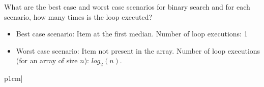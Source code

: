 \begin{exercise}
What are the best case and worst case scenarios for binary search and for each scenario, how many times is the loop executed?
\end{exercise}
\begin{answer}
\begin{itemize}
\item Best case scenario: Item at the first median. Number of loop executions: 1
\item Worst case scenario: Item not present in the array. Number of loop executions (for an array of size $n$): $log_2(n)$.	
\end{itemize}
\end{answer}



p{1cm}|